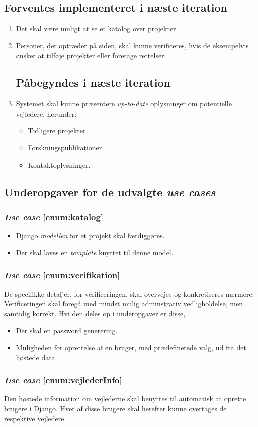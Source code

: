 \documentclass[11pt]{article}
\begin{document}
\subsection*{Forventes implementeret i næste iteration}
\begin{enumerate}
	\item \label{enum:katalog} Det skal være muligt at se et katalog over projekter.

	\item \label{enum:verifikation} Personer, der optræder på siden, skal kunne verificeres, hvis de eksempelvis ønsker at tilføje projekter eller foretage rettelser.

\subsection*{Påbegyndes i næste iteration}

	\item \label{enum:vejlederInfo} Systemet skal kunne præsentere \textit{up-to-date} oplysninger om potentielle vejledere, herunder:
	\begin{itemize}
		\item Tidligere projekter.
		\item Forskningspublikationer.
		\item Kontaktoplysninger.
	\end{itemize}
\end{enumerate}

\subsection{Underopgaver for de udvalgte \textit{use cases}}
\subsubsection*{\textit{Use case} \ref{enum:katalog}}
\begin{itemize}
	\item Django \textit{modellen} for et projekt skal færdiggøres.
	\item Der skal laves en \textit{template} knyttet til denne model.
\end{itemize}

\subsubsection*{\textit{Use case} \ref{enum:verifikation}}
De specifikke detaljer, for verificeringen, skal overvejes og konkretiseres nærmere. Verificeringen skal foregå med mindst mulig adminstrativ vedligholdelse, men samtidig korrekt. Hvi den deles op i underopgaver er disse,
\begin{itemize}
	\item Der skal en password generering.
	\item Muligheden for oprettelse af en bruger, med prædefinerede valg, ud fra det høstede data.
\end{itemize}

\subsubsection*{\textit{Use case} \ref{enum:vejlederInfo}}
Den høstede information om vejlederne skal benyttes til automatisk at oprette brugere i Django. Hver af disse brugere skal herefter kunne overtages de respektive vejledere.
\end{document}
